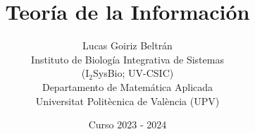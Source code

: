 \documentclass{article}
\title{Teoría de la Información}
\date{Curso 2023 - 2024}
\author{Lucas Goiriz Beltrán\\ Instituto de Biología Integrativa de Sistemas\\(I$_2$SysBio; UV-CSIC)\\Departamento de Matemática Aplicada\\Universitat Politècnica de València (UPV)}
\begin{document}
\maketitle

\tableofcontents

\pagebreak











\pagebreak


\end{document}
